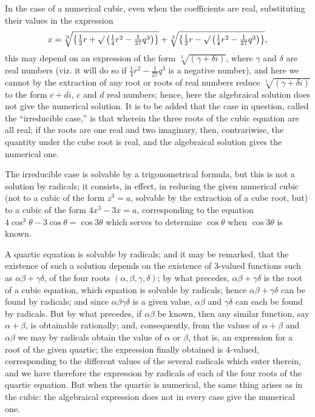 \documentclass[12pt,a4paper]{article}
\theoremstyle{plain}
\theoremstyle{definition}
\theoremstyle{remark}
\begin{document}
In the case of a numerical cubic, even when the coefficients are real, substituting their values in the expression
\[
x = \sqrt[3]{\left\{\tfrac{1}{2}r + \surd\left(\tfrac{1}{4}r^2 - \tfrac{1}{27}q^3\right)\right\}} + \sqrt[3]{\left\{\tfrac{1}{2}r - \surd\left(\tfrac{1}{4}r^2 - \tfrac{1}{27}q^3\right)\right\}},
\]
this may depend on an expression of the form $\sqrt[3]{(\gamma + \delta i)}$, where $\gamma$ and $\delta$ are real numbers (viz. it will do so if $\frac{1}{4}r^2 - \frac{1}{27}q^3$ is a negative number), and here we cannot by the extraction of any root or roots of real numbers reduce $\sqrt[3]{(\gamma + \delta i)}$ to the form $c + di$, $c$ and $d$ real numbers; hence, here the algebraical solution does not give the numerical solution. It is to be added that the case in question, called the ``irreducible case,'' is that wherein the three roots of the cubic equation are all real; if the roots are one real and two imaginary, then, contrariwise, the quantity under the cube root is real, and the algebraical solution gives the numerical one.

The irreducible case is solvable by a trigonometrical formula, but this is not a solution by radicals; it consists, in effect, in reducing the given numerical cubic (not to a cubic of the form $z^3 = a$, solvable by the extraction of a cube root, but) to a cubic of the form $4x^3 - 3x = a$, corresponding to the equation $4\cos^3\theta - 3\cos\theta = \cos 3\theta$ which serves to determine $\cos\theta$ when $\cos 3\theta$ is known.

A quartic equation is solvable by radicals; and it may be remarked, that the existence of such a solution depends on the existence of 3-valued functions such as $\alpha\beta + \gamma\delta$, of the four roots $(\alpha, \beta, \gamma, \delta)$; by what precedes, $\alpha\beta + \gamma\delta$ is the root of a cubic equation, which equation is solvable by radicals; hence $\alpha\beta + \gamma\delta$ can be found by radicals; and since $\alpha\beta\gamma\delta$ is a given value, $\alpha\beta$ and $\gamma\delta$ can each be found by radicals. But by what precedes, if $\alpha\beta$ be known, then any similar function, say $\alpha + \beta$, is obtainable rationally; and, consequently, from the values of $\alpha + \beta$ and $\alpha\beta$ we may by radicals obtain the value of $\alpha$ or $\beta$, that is, an expression for a root of the given quartic; the expression finally obtained is 4-valued, corresponding to the different values of the several radicals which enter therein, and we have therefore the expression by radicals of each of the four roots of the quartic equation. But when the quartic is numerical, the same thing arises as in the cubic: the algebraical expression does not in every case give the numerical one.
\end{document}
